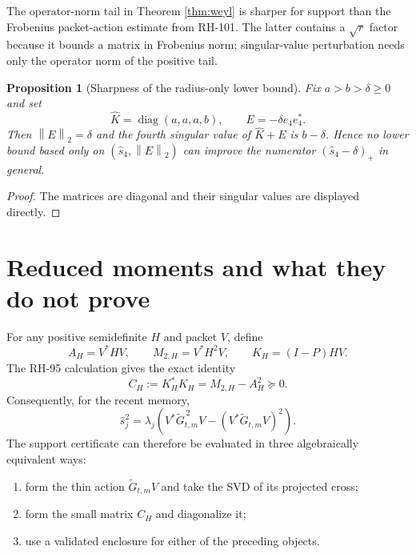 \documentclass[11pt]{article}
\newtheorem{proposition}[theorem]{Proposition}
\theoremstyle{definition}
\theoremstyle{remark}
\newcommand{\norm}[1]{\left\lVert#1\right\rVert}
\newcommand{\diag}{\operatorname{diag}}
\begin{document}
The operator-norm tail in Theorem \ref{thm:weyl} is sharper for support than
the Frobenius packet-action estimate from RH-101.  The latter contains a
$\sqrt r$ factor because it bounds a matrix in Frobenius norm; singular-value
perturbation needs only the operator norm of the positive tail.

\begin{proposition}[Sharpness of the radius-only lower bound]
\label{prop:sharp}
Fix $a>b>\delta\ge0$ and set
\[
 \widehat K=\diag(a,a,a,b),
 \qquad E=-\delta e_4e_4^*.
\]
Then $\norm E_2=\delta$ and the fourth singular value of
$\widehat K+E$ is $b-\delta$.  Hence no lower bound based only on
$(\widehat s_4,\norm E_2)$ can improve the numerator
$(\widehat s_4-\delta)_+$ in general.
\end{proposition}

\begin{proof}
The matrices are diagonal and their singular values are displayed directly.
\end{proof}

\section{Reduced moments and what they do not prove}
\label{sec:moments}

For any positive semidefinite $H$ and packet $V$, define
\begin{equation}
 A_H=V^*HV,
 \qquad M_{2,H}=V^*H^2V,
 \qquad K_H=(I-P)HV.
\end{equation}
The RH-95 calculation gives the exact identity
\begin{equation}
 C_H:=K_H^*K_H=M_{2,H}-A_H^2\succeq0.
 \label{eq:momentcross}
\end{equation}
Consequently, for the recent memory,
\begin{equation}
 \widehat s_j^2
 =\lambda_j\!\left(
 V^*\widetilde G_{t,m}^{\,2}V
 -(V^*\widetilde G_{t,m}V)^2
 \right).
 \label{eq:moment-eigen}
\end{equation}
The support certificate can therefore be evaluated in three algebraically
equivalent ways:
\begin{enumerate}[leftmargin=2.2em]
 \item form the thin action $\widetilde G_{t,m}V$ and take the SVD of its
       projected cross;
 \item form the small matrix $C_H$ and diagonalize it;
 \item use a validated enclosure for either of the preceding objects.
\end{enumerate}
\end{document}
